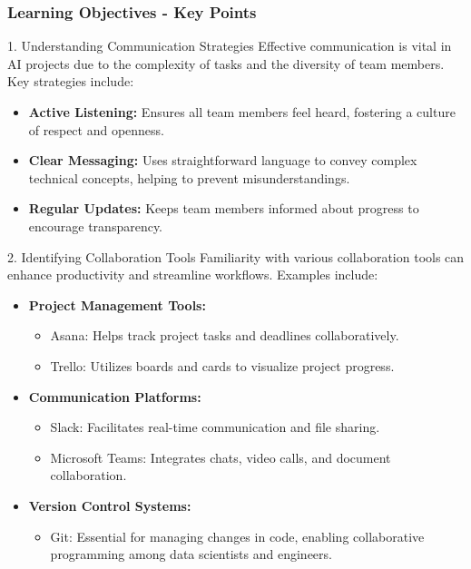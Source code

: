 \documentclass[aspectratio=169]{beamer}
\begin{document}
\begin{frame}[fragile]
    \frametitle{Learning Objectives - Key Points}
    \begin{block}{1. Understanding Communication Strategies}
        Effective communication is vital in AI projects due to the complexity of tasks and the diversity of team members. Key strategies include:
        \begin{itemize}
            \item \textbf{Active Listening:} Ensures all team members feel heard, fostering a culture of respect and openness.
            \item \textbf{Clear Messaging:} Uses straightforward language to convey complex technical concepts, helping to prevent misunderstandings.
            \item \textbf{Regular Updates:} Keeps team members informed about progress to encourage transparency.
        \end{itemize}
    \end{block}
    
    \begin{block}{2. Identifying Collaboration Tools}
        Familiarity with various collaboration tools can enhance productivity and streamline workflows. Examples include:
        \begin{itemize}
            \item \textbf{Project Management Tools:}
                \begin{itemize}
                    \item Asana: Helps track project tasks and deadlines collaboratively.
                    \item Trello: Utilizes boards and cards to visualize project progress.
                \end{itemize}
            \item \textbf{Communication Platforms:}
                \begin{itemize}
                    \item Slack: Facilitates real-time communication and file sharing.
                    \item Microsoft Teams: Integrates chats, video calls, and document collaboration.
                \end{itemize}
            \item \textbf{Version Control Systems:}
                \begin{itemize}
                    \item Git: Essential for managing changes in code, enabling collaborative programming among data scientists and engineers.
                \end{itemize}
        \end{itemize}
    \end{block}
\end{frame}
\end{document}
